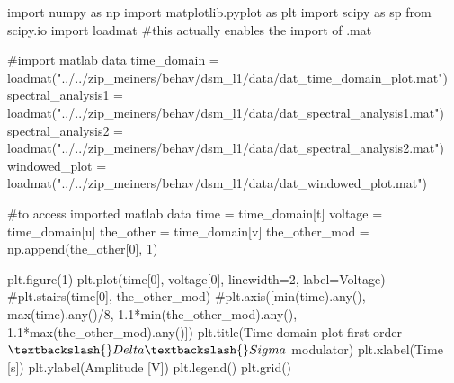 \documentclass[
  letterpaper,
  DIV=11,
  numbers=noendperiod]{scrartcl}
\newenvironment{Shaded}{\begin{snugshade}}{\end{snugshade}}
\newcommand{\CommentTok}[1]{\textcolor[rgb]{0.37,0.37,0.37}{#1}}
\newcommand{\DecValTok}[1]{\textcolor[rgb]{0.68,0.00,0.00}{#1}}
\newcommand{\ImportTok}[1]{\textcolor[rgb]{0.00,0.46,0.62}{#1}}
\newcommand{\NormalTok}[1]{\textcolor[rgb]{0.00,0.23,0.31}{#1}}
\newcommand{\OperatorTok}[1]{\textcolor[rgb]{0.37,0.37,0.37}{#1}}
\newcommand{\StringTok}[1]{\textcolor[rgb]{0.13,0.47,0.30}{#1}}
\begin{document}
\begin{Shaded}
\begin{Highlighting}[]
\ImportTok{import}\NormalTok{ numpy }\ImportTok{as}\NormalTok{ np}
\ImportTok{import}\NormalTok{ matplotlib.pyplot }\ImportTok{as}\NormalTok{ plt}
\ImportTok{import}\NormalTok{ scipy }\ImportTok{as}\NormalTok{ sp}
\ImportTok{from}\NormalTok{ scipy.io }\ImportTok{import}\NormalTok{ loadmat }\CommentTok{\#this actually enables the import of .mat}

\CommentTok{\#import matlab data}
\NormalTok{time\_domain }\OperatorTok{=}\NormalTok{ loadmat(}\StringTok{"../../zip\_meiners/behav/dsm\_l1/data/dat\_time\_domain\_plot.mat"}\NormalTok{)}
\NormalTok{spectral\_analysis1 }\OperatorTok{=}\NormalTok{ loadmat(}\StringTok{"../../zip\_meiners/behav/dsm\_l1/data/dat\_spectral\_analysis1.mat"}\NormalTok{)}
\NormalTok{spectral\_analysis2 }\OperatorTok{=}\NormalTok{ loadmat(}\StringTok{"../../zip\_meiners/behav/dsm\_l1/data/dat\_spectral\_analysis2.mat"}\NormalTok{)}
\NormalTok{windowed\_plot }\OperatorTok{=}\NormalTok{ loadmat(}\StringTok{"../../zip\_meiners/behav/dsm\_l1/data/dat\_windowed\_plot.mat"}\NormalTok{)}

\CommentTok{\#to access imported matlab data}
\NormalTok{time }\OperatorTok{=}\NormalTok{ time\_domain[}\StringTok{\textquotesingle{}t\textquotesingle{}}\NormalTok{]}
\NormalTok{voltage }\OperatorTok{=}\NormalTok{ time\_domain[}\StringTok{\textquotesingle{}u\textquotesingle{}}\NormalTok{]}
\NormalTok{the\_other }\OperatorTok{=}\NormalTok{ time\_domain[}\StringTok{\textquotesingle{}v\textquotesingle{}}\NormalTok{]}
\NormalTok{the\_other\_mod }\OperatorTok{=}\NormalTok{ np.append(the\_other[}\DecValTok{0}\NormalTok{], }\DecValTok{1}\NormalTok{)}

\NormalTok{plt.figure(}\DecValTok{1}\NormalTok{)}
\NormalTok{plt.plot(time[}\DecValTok{0}\NormalTok{], voltage[}\DecValTok{0}\NormalTok{], linewidth}\OperatorTok{=}\DecValTok{2}\NormalTok{, label}\OperatorTok{=}\StringTok{\textquotesingle{}Voltage\textquotesingle{}}\NormalTok{)}
\CommentTok{\#plt.stairs(time[0], the\_other\_mod)}
\CommentTok{\#plt.axis([min(time).any(), max(time).any()/8, 1.1*min(the\_other\_mod).any(), 1.1*max(the\_other\_mod).any()])}
\NormalTok{plt.title(}\StringTok{\textquotesingle{}Time domain plot first order $\textbackslash{}Delta \textbackslash{}Sigma$ modulator\textquotesingle{}}\NormalTok{)}
\NormalTok{plt.xlabel(}\StringTok{\textquotesingle{}Time [s]\textquotesingle{}}\NormalTok{)}
\NormalTok{plt.ylabel(}\StringTok{\textquotesingle{}Amplitude [V]\textquotesingle{}}\NormalTok{)}
\NormalTok{plt.legend()}
\NormalTok{plt.grid()}
\end{Highlighting}
\end{Shaded}
\end{document}
